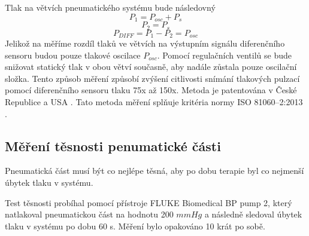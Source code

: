 Tlak na větvích pneumatického systému bude následovný
\begin{equation*}
    P_1 = P_{osc} + P_s
\end{equation*}
\begin{equation*}
    P_2 = P_s
\end{equation*}
\begin{equation}
    P_{DIFF} = P_1 - P_2 = P_{osc}
\end{equation}
Jelikož na měříme rozdíl tlaků ve větvích na výstupním signálu diferenčního sensoru budou pouze tlakové oscilace $P_{osc}$.
Pomocí regulačních ventilů se bude snižovat statický tlak v obou větví současně, aby nadále zůstala pouze oscilační složka.
Tento způsob měření způsobí zvýšení citlivosti snímání tlakových pulzací pomocí diferenčního sensoru tlaku 75x až 150x. \cite{cite:Habilitace}
Metoda je patentována v České Republice a USA \cite{cite:2}. Tato metoda měření splňuje kritéria normy ISO 81060–2:2013 \cite{cite:Validation}.
\pagebreak
\subsection{Měření těsnosti penumatické části}
Pneumatická část musí být co nejlépe těsná, aby po dobu terapie byl co nejmenší úbytek tlaku v systému.
\par
Test těsnosti probíhal pomocí přístroje FLUKE Biomedical BP pump 2, který natlakoval pneumatickou část na hodnotu 200 $mmHg$ a následně sledoval úbytek tlaku v systému po dobu 60 s.
Měření bylo opakováno 10 krát po sobě.

